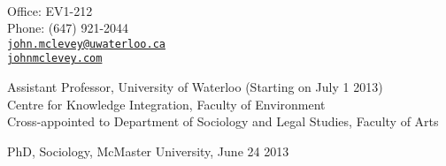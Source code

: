 \documentclass[11pt,usenames,dvipsnames]{article}
\makeatletter
\def\myemail{john.mclevey@uwaterloo.ca}
\def\myphone{(647) 921-2044}
\def\lastupdated{Last Updated: June 25, 2013}
\makeatother
\begin{document}
\begin{minipage}[t]{2.95in}
 \\
  \end{minipage}
\hfill     
\hfill
\begin{minipage}[t]{1.7in}
  \flushright \footnotesize Office: EV1-212 \\ Phone: \myphone \\ 
  {\scriptsize  \texttt{\href{mailto:\myemail}{\myemail}}} \\
  {\scriptsize  \texttt{\href{http://www.johnmclevey.com}{johnmclevey.com}}}\\
\end{minipage}


\bigskip

\reversemarginpar

\medskip 


\noindent Assistant Professor, University of Waterloo (Starting on July 1 2013) \\
\noindent Centre for Knowledge Integration, Faculty of Environment \\
\noindent Cross-appointed to Department of Sociology and Legal Studies, Faculty of Arts \\

\medskip 
{}

\noindent PhD, Sociology, McMaster University, June 24 2013

\end{document}
